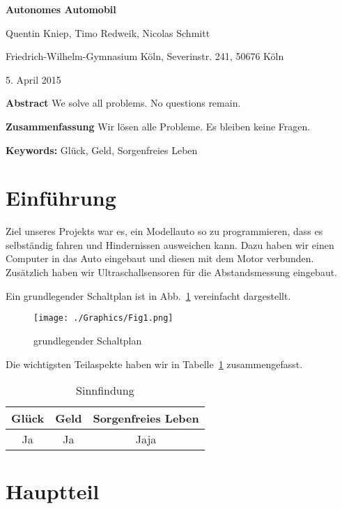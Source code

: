 \documentclass[a4paper,12pt]{article}
\begin{document}
{\Large\bf Autonomes Automobil}

\medskip

Quentin Kniep, Timo Redweik, Nicolas Schmitt

\medskip

Friedrich-Wilhelm-Gymnasium K\"oln, Severinstr. 241, 50676 K\"oln

\medskip

5. April  2015

\medskip

{\bf  Abstract}
{\small We solve all problems. No questions remain.}

\medskip

{\bf  Zusammenfassung}
{\small Wir l\"osen alle Probleme. Es bleiben keine Fragen.}

\medskip

{\bf  Keywords:}
{\small Gl\"uck, Geld, Sorgenfreies Leben}

\bigskip


\section{Einf\"uhrung}\label{sec1}

Ziel unseres Projekts war es, ein Modellauto so zu programmieren, dass es selbst\"andig fahren und Hindernissen ausweichen kann.
Dazu haben wir einen Computer in das Auto eingebaut und diesen mit dem Motor verbunden.
Zus\"atzlich haben wir Ultraschallsensoren f\"ur die Abstandsmessung eingebaut.

Ein grundlegender Schaltplan ist in Abb.~\ref{Fig1} vereinfacht dargestellt.

\begin{figure}[h]
	\centering
	\texttt{[image: ./Graphics/Fig1.png]}
	\caption{grundlegender Schaltplan}
	\label{Fig1}
\end{figure}

Die wichtigsten Teilaspekte haben wir in Tabelle~\ref{Tab1} zusammengefasst.

\begin{table}[h]
	\centering
	\begin{tabular}{|c|c|c|}
	\hline
		Gl\"uck & Geld  & Sorgenfreies Leben  \\ \hline
		Ja  & Ja & Jaja \\ \hline
	\end{tabular}
	\caption{Sinnfindung}
	\label{Tab1}
\end{table}


\section{Hauptteil}\label{sec2}
\end{document}
